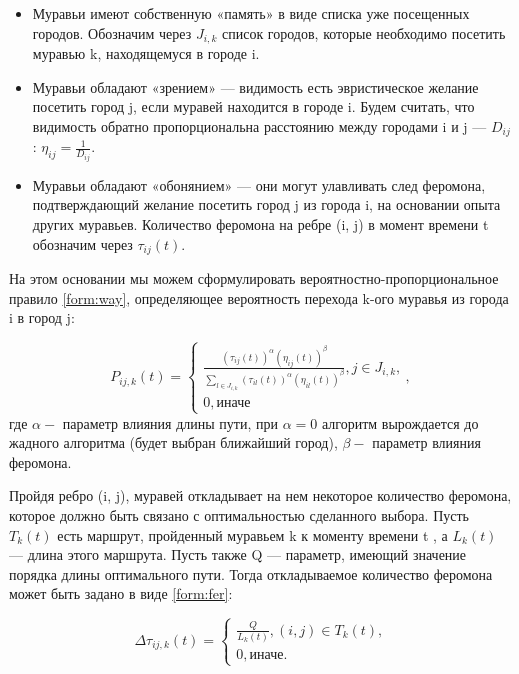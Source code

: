 \begin{itemize}
	\item Муравьи имеют собственную «память» в виде списка уже посещенных городов. Обозначим через $J_{i, k}$ список городов, которые необходимо посетить муравью k, находящемуся в городе i.

	\item Муравьи обладают «зрением» — видимость есть эвристическое желание посетить город j, если муравей находится в городе i. Будем считать, что видимость обратно пропорциональна расстоянию между городами i и j — $D_{ij}$: $\eta_{ij} = \frac{1}{D_{ij}}$.
	\item Муравьи обладают «обонянием» — они могут улавливать след феромона, подтверждающий желание посетить город j из города i, на основании опыта других муравьев. Количество феромона на ребре (i, j) в момент времени t обозначим через $\tau_{ij}(t)$.
\end{itemize}

На этом основании мы можем сформулировать вероятностно-пропорциональное правило \ref{form:way}, определяющее вероятность перехода k-ого муравья из города i в город j:


\begin{equation}
	\label{form:way}
	P_{ij,k}(t) = \begin{cases}
		\frac {(\tau_{ij}(t))^{\alpha }(\eta_{ij}(t))^{\beta }}{\sum\limits_{l \in J_{i, k}}(\tau_{il}(t))^{\alpha }(\eta_{il}(t))^{\beta }}, \textrm{$j \in J_{i, k}$,} \\
		0, \textrm{иначе}
	\end{cases},
\end{equation}
где $\alpha - $ параметр влияния длины пути, при $\alpha=0$ алгоритм вырождается до жадного алгоритма (будет выбран ближайший город), $\beta - $ параметр влияния феромона.

Пройдя ребро (i, j), муравей откладывает на нем некоторое количество феромона, которое должно быть связано с оптимальностью сделанного выбора.
Пусть $T_{k}(t)$ есть маршрут, пройденный муравьем k к моменту времени t , а $L_{k}(t)$ — длина этого маршрута. Пусть также Q — параметр, имеющий значение порядка длины оптимального пути. Тогда откладываемое количество феромона может быть задано в виде \ref{form:fer}:

\begin{equation}
	\label{form:fer}
	\Delta \tau_{ij, k}(t) = \begin{cases}
		\frac{Q}{L_{k}(t)}, \textrm{$(i, j) \in T_{k}(t)$,} \\
		0, \textrm{иначе.}
	\end{cases}
\end{equation}

